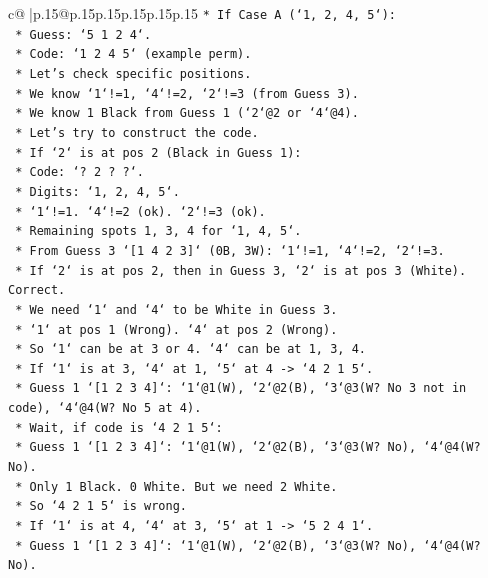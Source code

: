 \documentclass{article}
\begin{document}
{\begin{supertabular}{c@{$\;$}|p{.15\linewidth}@{}p{.15\linewidth}p{.15\linewidth}p{.15\linewidth}p{.15\linewidth}p{.15\linewidth}}
{{{\texttt{*   If Case A (`1, 2, 4, 5`):} \\
\texttt{    *   Guess: `5 1 2 4`.} \\
\texttt{    *   Code: `1 2 4 5` (example perm).} \\
\texttt{    *   Let's check specific positions.} \\
\texttt{    *   We know `1`!=1, `4`!=2, `2`!=3 (from Guess 3).} \\
\texttt{    *   We know 1 Black from Guess 1 (`2`@2 or `4`@4).} \\
\texttt{    *   Let's try to construct the code.} \\
\texttt{    *   If `2` is at pos 2 (Black in Guess 1):} \\
\texttt{        *   Code: `? 2 ? ?`.} \\
\texttt{        *   Digits: `1, 2, 4, 5`.} \\
\texttt{        *   `1`!=1. `4`!=2 (ok). `2`!=3 (ok).} \\
\texttt{        *   Remaining spots 1, 3, 4 for `1, 4, 5`.} \\
\texttt{        *   From Guess 3 `{[}1 4 2 3{]}` (0B, 3W): `1`!=1, `4`!=2, `2`!=3.} \\
\texttt{        *   If `2` is at pos 2, then in Guess 3, `2` is at pos 3 (White). Correct.} \\
\texttt{        *   We need `1` and `4` to be White in Guess 3.} \\
\texttt{        *   `1` at pos 1 (Wrong). `4` at pos 2 (Wrong).} \\
\texttt{        *   So `1` can be at 3 or 4. `4` can be at 1, 3, 4.} \\
\texttt{        *   If `1` is at 3, `4` at 1, `5` at 4 {-}> `4 2 1 5`.} \\
\texttt{            *   Guess 1 `{[}1 2 3 4{]}`: `1`@1(W), `2`@2(B), `3`@3(W? No 3 not in code), `4`@4(W? No 5 at 4).} \\
\texttt{            *   Wait, if code is `4 2 1 5`:} \\
\texttt{                *   Guess 1 `{[}1 2 3 4{]}`: `1`@1(W), `2`@2(B), `3`@3(W? No), `4`@4(W? No).} \\
\texttt{                *   Only 1 Black. 0 White. But we need 2 White.} \\
\texttt{                *   So `4 2 1 5` is wrong.} \\
\texttt{        *   If `1` is at 4, `4` at 3, `5` at 1 {-}> `5 2 4 1`.} \\
\texttt{            *   Guess 1 `{[}1 2 3 4{]}`: `1`@1(W), `2`@2(B), `3`@3(W? No), `4`@4(W? No).} \\
}}}
\end{supertabular}}
\end{document}
